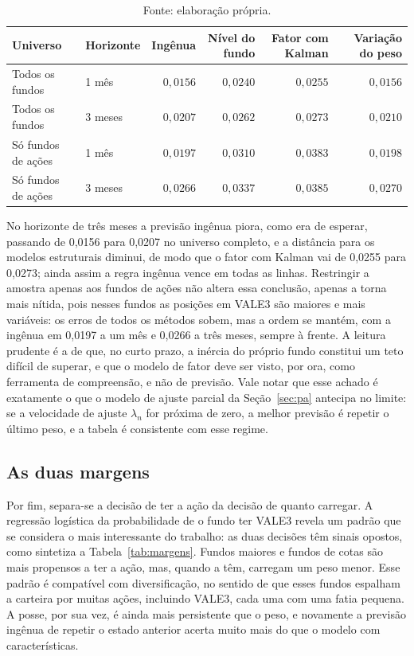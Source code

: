 \documentclass[12pt,a4paper]{article}
\begin{document}
\begin{table}[h]\centering\small
\caption{Erro de previsão fora da amostra, medido pela raiz do erro quadrático médio, nos
horizontes de um e de três meses.}
\label{tab:fc}
\begin{tabular}{@{}llrrrr@{}}
\toprule
Universo & Horizonte & Ingênua & Nível do fundo & Fator com Kalman & Variação do peso \\
\midrule
Todos os fundos      & 1 mês  & $0{,}0156$ & $0{,}0240$ & $0{,}0255$ & $0{,}0156$ \\
Todos os fundos      & 3 meses& $0{,}0207$ & $0{,}0262$ & $0{,}0273$ & $0{,}0210$ \\
Só fundos de ações   & 1 mês  & $0{,}0197$ & $0{,}0310$ & $0{,}0383$ & $0{,}0198$ \\
Só fundos de ações   & 3 meses& $0{,}0266$ & $0{,}0337$ & $0{,}0385$ & $0{,}0270$ \\
\bottomrule
\end{tabular}
\caption*{\footnotesize Fonte: elaboração própria.}
\end{table}

No horizonte de três meses a previsão ingênua piora, como era de esperar, passando de 0,0156 para
0,0207 no universo completo, e a distância para os modelos estruturais diminui, de modo que o
fator com Kalman vai de 0,0255 para 0,0273; ainda assim a regra ingênua vence em todas as linhas.
Restringir a amostra apenas aos fundos de ações não altera essa conclusão, apenas a torna mais
nítida, pois nesses fundos as posições em VALE3 são maiores e mais variáveis: os erros de todos os
métodos sobem, mas a ordem se mantém, com a ingênua em 0,0197 a um mês e 0,0266 a três meses,
sempre à frente. A leitura prudente é a de que, no curto prazo, a inércia do próprio fundo
constitui um teto difícil de superar, e que o modelo de fator deve ser visto, por ora, como
ferramenta de compreensão, e não de previsão. Vale notar que esse achado é exatamente o que o
modelo de ajuste parcial da Seção~\ref{sec:pa} antecipa no limite: se a velocidade de ajuste
$\lambda_n$ for próxima de zero, a melhor previsão é repetir o último peso, e a tabela é
consistente com esse regime.

\subsection{As duas margens}

Por fim, separa-se a decisão de ter a ação da decisão de quanto carregar. A regressão logística da
probabilidade de o fundo ter VALE3 revela um padrão que se considera o mais interessante do
trabalho: as duas decisões têm sinais opostos, como sintetiza a Tabela~\ref{tab:margens}. Fundos
maiores e fundos de cotas são mais propensos a ter a ação, mas, quando a têm, carregam um peso
menor. Esse padrão é compatível com diversificação, no sentido de que esses fundos espalham a
carteira por muitas ações, incluindo VALE3, cada uma com uma fatia pequena. A posse, por sua vez,
é ainda mais persistente que o peso, e novamente a previsão ingênua de repetir o estado anterior
acerta muito mais do que o modelo com características.
\end{document}
